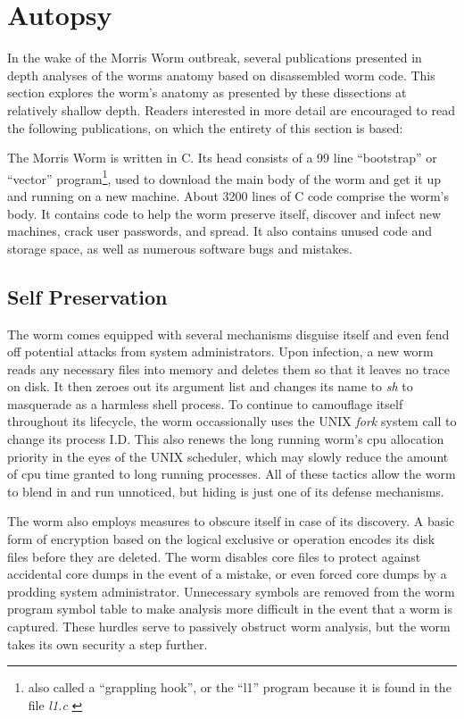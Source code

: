 \section*{Autopsy}
In the wake of the Morris Worm outbreak, several
publications presented in depth analyses of the worms
anatomy based on disassembled worm code. This section explores the worm's
anatomy as presented by these dissections at relatively shallow depth. Readers interested
in more detail are encouraged to read the following publications, on which the
entirety of this section is based: 
\cite{seeley_tour_1989}
\cite{spafford_crisis_1989}
\cite{spafford_internet_1989}
\cite{eichin_microscope_1989}

The Morris Worm is written in C. Its head consists of a 99 line ``bootstrap''
or ``vector'' program\footnote{
also called a ``grappling hook'', or the ``l1'' program because it is found in 
the file \textit{l1.c} \cite{spafford_crisis_1989}
}, used to download the main body of the worm and get it up
and running on a new machine. About 3200 lines of C code comprise the worm's
body. It contains code to help the worm preserve itself, discover and infect
new machines, crack user passwords, and spread. It also contains unused code
and storage space, as well as
numerous software bugs and mistakes.


\subsection*{Self Preservation}
The worm comes equipped with several mechanisms disguise itself and even fend
off potential attacks from system administrators. Upon infection, a new worm
reads any necessary files into memory and deletes them so that it leaves no
trace on disk. It then zeroes out its argument list and changes its name to
\textit{sh} to masquerade as a harmless shell process. To continue to
camouflage itself throughout its lifecycle, the worm occassionally uses the
UNIX \textit{fork} system call to change its process I.D. This also renews the
long running worm's cpu allocation priority in the eyes of the UNIX
scheduler, which may slowly reduce the amount of cpu time granted to long
running processes. All of these tactics allow the worm to blend in and run
unnoticed, but hiding is just one of its defense mechanisms.

The worm also employs measures to obscure itself in case of its discovery. A
basic form of encryption based on the logical exclusive or operation
encodes its disk files before they are deleted. The worm disables core files to
protect against accidental core dumps in the event of a mistake, or even forced
core dumps by a prodding system administrator. Unnecessary symbols are removed
from the worm program symbol table to make analysis more difficult in the event
that a worm is captured. These hurdles serve to passively obstruct worm
analysis, but the worm takes its own security a step further.

